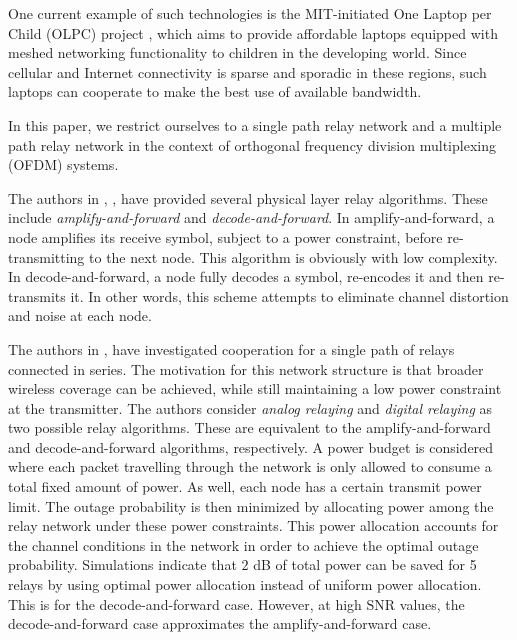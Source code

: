 \documentclass[conference]{IEEEtran}
\begin{document}
One current example of such technologies is the MIT-initiated One
Laptop per Child (OLPC) project \cite{website:OLPC}, which aims to
provide affordable laptops equipped with meshed networking
functionality to children in the developing world.  Since cellular
and Internet connectivity is sparse and sporadic in these regions,
such laptops can cooperate to make the best use of available
bandwidth.

In this paper, we restrict ourselves to a single path relay
network and a multiple path relay network in the context of
orthogonal frequency division multiplexing (OFDM) systems.

The authors in \cite{thesis:Laneman01}, \cite{article:Laneman01}, \cite{article:Laneman02} have provided several physical layer relay algorithms.  These include \emph{amplify-and-forward} and \emph{decode-and-forward}.  In amplify-and-forward, a node amplifies its receive symbol, subject to a power constraint, before re-transmitting to the next node.  This algorithm is obviously with low complexity.  In decode-and-forward, a node fully decodes a symbol, re-encodes it and then re-transmits it.  In other words, this scheme attempts to eliminate channel distortion and noise at each node.

The authors in \cite{article:Hasna02}, \cite{article:Hasna01} have investigated cooperation for a single path of relays connected in series.  The motivation for this network structure is that broader wireless coverage can be achieved, while still maintaining a low power constraint at the transmitter.  The authors consider \emph{analog relaying} and \emph{digital relaying} as two possible relay algorithms.  These are equivalent to the amplify-and-forward and decode-and-forward algorithms, respectively.  A power budget is considered where each packet travelling through the network is only allowed to consume a total fixed amount of power.  As well, each node has a certain transmit power limit.  The outage probability is then minimized by allocating power among the relay network under these power constraints.  This power allocation accounts for the channel conditions in the network in order to achieve the optimal outage probability.  Simulations indicate that $2$ dB of total power can be saved for 5 relays by using optimal power allocation instead of uniform power allocation.  This is for the decode-and-forward case.  However, at high $\mbox{SNR}$ values, the decode-and-forward case approximates the amplify-and-forward case.
\end{document}
